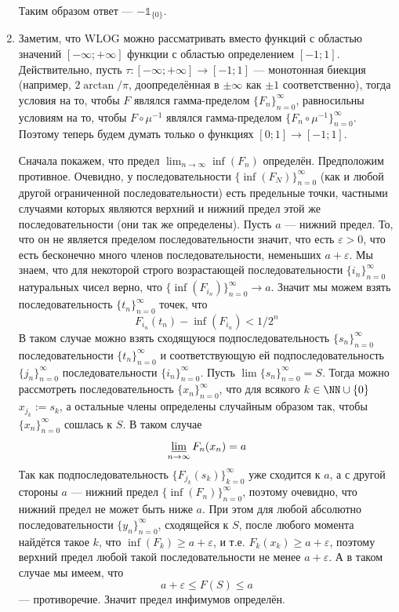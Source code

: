 \documentclass[12pt,a4paper]{article}
\begin{document}
\begin{enumproblem}
\begin{enumerate}
            Таким образом ответ --- $-\mathds{1}_{\{0\}}$.

            \item Заметим, что WLOG можно рассматривать вместо функций с областью значений $[-\infty; +\infty]$ функции с областью определением $[-1; 1]$. Действительно, пусть $\tau: [-\infty; +\infty] \to [-1;1]$ --- монотонная биекция (например, $2\arctan/\pi$, доопределённая в $\pm\infty$ как $\pm 1$ соответственно), тогда условия на то, чтобы $F$ являлся гамма-пределом $\{F_n\}_{n=0}^\infty$, равносильны условиям на то, чтобы $F\circ \mu^{-1}$ являлся гамма-пределом $\{F_n \circ \mu^{-1}\}_{n=0}^\infty$. Поэтому теперь будем думать только о функциях $[0; 1] \to [-1; 1]$.

            Сначала покажем, что предел $\lim_{n \to \infty} \inf(F_n)$ определён. Предположим противное. Очевидно, у последовательности $\{\inf(F_N)\}_{n=0}^\infty$ (как и любой другой ограниченной последовательности) есть предельные точки, частными случаями которых являются верхний и нижний предел этой же последовательности (они так же определены). Пусть $a$ --- нижний предел. То, что он не является пределом последовательности значит, что есть $\varepsilon > 0$, что есть бесконечно много членов последовательности, неменьших $a + \varepsilon$. Мы знаем, что для некоторой строго возрастающей последовательности $\{i_n\}_{n=0}^\infty$ натуральных чисел верно, что $\{\inf(F_{i_n})\}_{n=0}^\infty \to a$. Значит мы можем взять последовательность $\{t_n\}_{n=0}^\infty$ точек, что
            \[F_{i_n}(t_n) - \inf(F_{i_n}) < 1/2^n\]
            В таком случае можно взять сходящуюся подпоследовательность $\{s_n\}_{n=0}^\infty$ последовательности $\{t_n\}_{n=0}^\infty$ и соответствующую ей подпоследовательность $\{j_n\}_{n=0}^\infty$ последовательности $\{i_n\}_{n=0}^\infty$. Пусть $\lim \{s_n\}_{n=0}^\infty = S$. Тогда можно рассмотреть последовательность $\{x_n\}_{n=0}^\infty$, что для всякого $k \in \NN \cup \{0\}$ $x_{j_k} := s_k$, а остальные члены определены случайным образом так, чтобы $\{x_n\}_{n=0}^\infty$ сошлась к $S$. В таком случае
            \[\varliminf_{n \to \infty} F_n(x_n) = a\]
            Так как подпоследовательность $\{F_{j_k}(s_k)\}_{k=0}^\infty$ уже сходится к $a$, а с другой стороны $a$ --- нижний предел $\{\inf(F_n)\}_{n=0}^\infty$, поэтому очевидно, что нижний предел не может быть ниже $a$. При этом для любой абсолютно последовательности $\{y_n\}_{n=0}^\infty$, сходящейся к $S$, после любого момента найдётся такое $k$, что $\inf(F_k) \geqslant a + \varepsilon$, и т.е. $F_k(x_k) \geqslant a + \varepsilon$, поэтому верхний предел любой такой последовательности не менее $a + \varepsilon$. А в таком случае мы имеем, что
            \[a + \varepsilon \leqslant F(S) \leqslant a\]
            --- противоречие. Значит предел инфимумов определён.


\end{enumerate}
\end{enumproblem}
\end{document}
